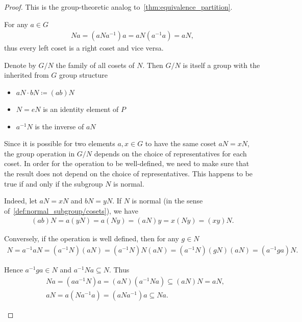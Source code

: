 \begin{proof}
  This is the group-theoretic analog to~\cref{thm:equivalence_partition}.

  \begin{description}
     For any \( a \in G \)
    \begin{align*}
      Na = (aNa^{-1})a = aN(a^{-1}a) = aN,
    \end{align*}
    thus every left coset is a right coset and vice versa.

     Denote by \( G / N \) the family of all cosets of \( N \). Then \( G / N \) is itself a group with the inherited from \( G \) group structure
    \begin{itemize}
      \item \( aN \cdot bN \coloneqq (ab)N \)
      \item \( N = eN \) is an identity element of \( P \)
      \item \( a^{-1} N \) is the inverse of \( aN \)
    \end{itemize}

    Since it is possible for two elements \( a, x \in G \) to have the same coset \( aN = xN \), the group operation in \( G / N \) depends on the choice of representatives for each coset. In order for the operation to be well-defined, we need to make sure that the result does not depend on the choice of representatives. This happens to be true if and only if the subgroup \( N \) is normal.

    Indeed, let \( aN = xN \) and \( bN = yN \). If \( N \) is normal (in the sense of~\ref{def:normal_subgroup/cosets}), we have
    \begin{align*}
      (ab)N = a(yN) = a(Ny) = (aN)y = x(Ny) = (xy)N.
    \end{align*}

    Conversely, if the operation is well defined, then for any \( g \in N \)
    \begin{align*}
      N = a^{-1} a N = (a^{-1} N) (a N) = (a^{-1} N) N (a N) = (a^{-1} N) (g N) (a N) = (a^{-1} g a) N.
    \end{align*}

    Hence \( a^{-1} g a \in N \) and \( a^{-1} N a \subseteq N \). Thus
    \begin{align*}
      &Na = (a a^{-1} N)a = (aN) (a^{-1} N a) \subseteq (aN) N = aN,
      \\
      &aN = a(N a^{-1} a) = (a N a^{-1}) a \subseteq Na.
    \end{align*}


\end{description}
\end{proof}
